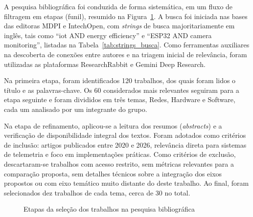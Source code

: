 A pesquisa bibliográfica foi conduzida de forma sistemática, em um fluxo de filtragem em
etapas (funil), resumido na Figura~\ref{fig:funil_bibliografico}. A busca foi iniciada nas
bases das editoras MDPI e IntechOpen, com \textit{strings} de busca majoritariamente em
inglês, tais como ``iot AND energy efficiency'' e ``ESP32 AND camera monitoring'', listadas
na Tabela~\ref{tab:strings_busca}. Como ferramentas auxiliares na descoberta de conexões
entre autores e na triagem inicial de relevância, foram utilizadas as plataformas
ResearchRabbit e Gemini Deep Research.

Na primeira etapa, foram identificados 120 trabalhos, dos quais foram lidos o título e as
palavras-chave. Os 60 considerados mais relevantes seguiram para a etapa seguinte e foram
divididos em três temas, Redes, Hardware e Software, cada um analisado por um integrante
do grupo.

Na etapa de refinamento, aplicou-se a leitura dos resumos (\textit{abstracts}) e a
verificação de disponibilidade integral dos textos. Foram adotados como critérios de
inclusão: artigos publicados entre 2020 e 2026, relevância direta para sistemas de
telemetria e foco em implementações práticas. Como critérios de exclusão, descartaram-se
trabalhos com acesso restrito, sem métricas relevantes para a comparação proposta, sem
detalhes técnicos sobre a integração dos eixos propostos ou com eixo temático muito
distante do deste trabalho. Ao final, foram selecionados dez trabalhos de cada tema, cerca
de 30 no total.

\begin{figure}[H]
    \centering
    \caption{Etapas da seleção dos trabalhos na pesquisa bibliográfica}
    \label{fig:funil_bibliografico}
\end{figure}

